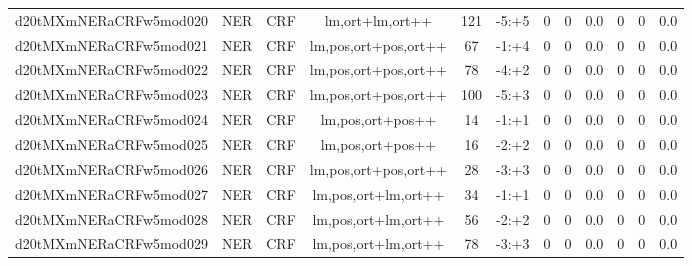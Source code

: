 \documentclass[a4paper]{article}
\begin{document}
\begin{landscape}
\begin{center}
\begin{tabular}{ |c|c|c|c|c|c|c|c|c|c|c|c|}
 
 	
 	\small{ d20tMXmNERaCRFw5mod020 } & \small{ NER} & \small{  CRF }  & lm,ort+lm,ort++  &  121 &  \small{  -5:+5 }  &  0 & 0 & 0.0  &  0 & 0 & 0.0 \\
 	

 
 	
 	\small{ d20tMXmNERaCRFw5mod021 } & \small{ NER} & \small{  CRF }  & lm,pos,ort+pos,ort++  &  67 &  \small{  -1:+4 }  &  0 & 0 & 0.0  &  0 & 0 & 0.0 \\
 	

 
 	
 	\small{ d20tMXmNERaCRFw5mod022 } & \small{ NER} & \small{  CRF }  & lm,pos,ort+pos,ort++  &  78 &  \small{  -4:+2 }  &  0 & 0 & 0.0  &  0 & 0 & 0.0 \\
 	

 
 	
 	\small{ d20tMXmNERaCRFw5mod023 } & \small{ NER} & \small{  CRF }  & lm,pos,ort+pos,ort++  &  100 &  \small{  -5:+3 }  &  0 & 0 & 0.0  &  0 & 0 & 0.0 \\
 	

 
 	
 	\small{ d20tMXmNERaCRFw5mod024 } & \small{ NER} & \small{  CRF }  & lm,pos,ort+pos++  &  14 &  \small{  -1:+1 }  &  0 & 0 & 0.0  &  0 & 0 & 0.0 \\
 	

 
 	
 	\small{ d20tMXmNERaCRFw5mod025 } & \small{ NER} & \small{  CRF }  & lm,pos,ort+pos++  &  16 &  \small{  -2:+2 }  &  0 & 0 & 0.0  &  0 & 0 & 0.0 \\
 	

 
 	
 	\small{ d20tMXmNERaCRFw5mod026 } & \small{ NER} & \small{  CRF }  & lm,pos,ort+pos,ort++  &  28 &  \small{  -3:+3 }  &  0 & 0 & 0.0  &  0 & 0 & 0.0 \\
 	

 
 	
 	\small{ d20tMXmNERaCRFw5mod027 } & \small{ NER} & \small{  CRF }  & lm,pos,ort+lm,ort++  &  34 &  \small{  -1:+1 }  &  0 & 0 & 0.0  &  0 & 0 & 0.0 \\
 	

 
 	
 	\small{ d20tMXmNERaCRFw5mod028 } & \small{ NER} & \small{  CRF }  & lm,pos,ort+lm,ort++  &  56 &  \small{  -2:+2 }  &  0 & 0 & 0.0  &  0 & 0 & 0.0 \\
 	

 
 	
 	\small{ d20tMXmNERaCRFw5mod029 } & \small{ NER} & \small{  CRF }  & lm,pos,ort+lm,ort++  &  78 &  \small{  -3:+3 }  &  0 & 0 & 0.0  &  0 & 0 & 0.0 \\
 	


\end{tabular}
\end{center}
\end{landscape}
\end{document}
